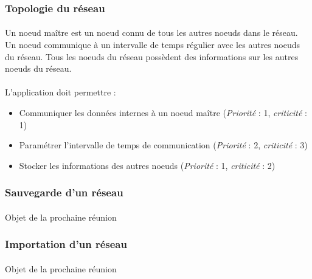 \documentclass[12pt]{article}
\newcommand{\besoin}[2] {
  (\textit{Priorité} : #1, \textit{criticité} : #2)
}
\begin{document}


\subsubsection{Topologie du réseau}

\paragraph{} Un noeud maître est un noeud connu de tous les autres noeuds dans le réseau. Un noeud communique à un intervalle de temps régulier avec les autres noeuds du réseau. Tous les noeuds du réseau possèdent des informations sur les autres noeuds du réseau.

\paragraph{} L'application doit permettre :
\begin{itemize}
	\item Communiquer les données internes à un noeud maître \besoin{1}{1}
	\item Paramétrer l'intervalle de temps de communication \besoin{2}{3}
	\item Stocker les informations des autres noeuds \besoin{1}{2}
\end{itemize}

\subsubsection{Sauvegarde d'un réseau}
\paragraph{}  Objet de la prochaine réunion

\subsubsection{Importation d'un réseau}
\paragraph{} Objet de la prochaine réunion
\end{document}
